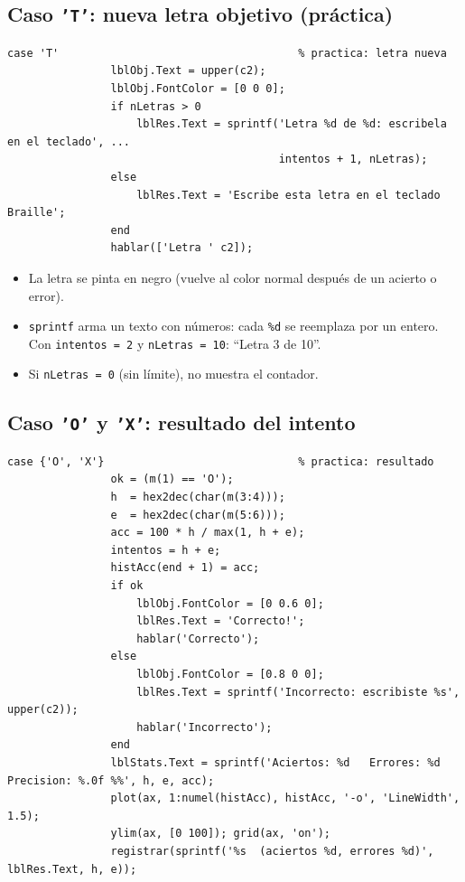 \documentclass[11pt,a4paper]{article}
\newcommand{\cod}[1]{\texttt{#1}}
\begin{document}
\subsection{Caso \texttt{'T'}: nueva letra objetivo (práctica)}
\begin{lstlisting}[firstnumber=219]
            case 'T'                                     % practica: letra nueva
                lblObj.Text = upper(c2);
                lblObj.FontColor = [0 0 0];
                if nLetras > 0
                    lblRes.Text = sprintf('Letra %d de %d: escribela en el teclado', ...
                                          intentos + 1, nLetras);
                else
                    lblRes.Text = 'Escribe esta letra en el teclado Braille';
                end
                hablar(['Letra ' c2]);
\end{lstlisting}
\begin{itemize}
  \item La letra se pinta en negro (vuelve al color normal después de un acierto o error).
  \item \cod{sprintf} arma un texto con números: cada \cod{\%d} se reemplaza por un entero.
        Con \cod{intentos = 2} y \cod{nLetras = 10}: ``Letra 3 de 10''.
  \item Si \cod{nLetras = 0} (sin límite), no muestra el contador.
\end{itemize}

\subsection{Caso \texttt{'O'} y \texttt{'X'}: resultado del intento}
\begin{lstlisting}[firstnumber=230]
            case {'O', 'X'}                              % practica: resultado
                ok = (m(1) == 'O');
                h  = hex2dec(char(m(3:4)));
                e  = hex2dec(char(m(5:6)));
                acc = 100 * h / max(1, h + e);
                intentos = h + e;
                histAcc(end + 1) = acc;
                if ok
                    lblObj.FontColor = [0 0.6 0];
                    lblRes.Text = 'Correcto!';
                    hablar('Correcto');
                else
                    lblObj.FontColor = [0.8 0 0];
                    lblRes.Text = sprintf('Incorrecto: escribiste %s', upper(c2));
                    hablar('Incorrecto');
                end
                lblStats.Text = sprintf('Aciertos: %d   Errores: %d   Precision: %.0f %%', h, e, acc);
                plot(ax, 1:numel(histAcc), histAcc, '-o', 'LineWidth', 1.5);
                ylim(ax, [0 100]); grid(ax, 'on');
                registrar(sprintf('%s  (aciertos %d, errores %d)', lblRes.Text, h, e));
\end{lstlisting}
\end{document}

